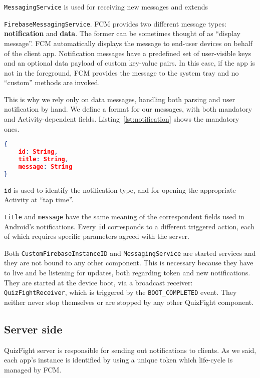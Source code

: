 \texttt{MessagingService} is used for receiving new messages and extends 

\texttt{FirebaseMessagingService}. FCM provides two different message types:
\textbf{notification} and \textbf{data}.
The former can be sometimes thought of as ``display message''.
FCM automatically displays the message to end-user devices on behalf of the
client app.
Notification messages have a predefined set of user-visible keys and an
optional data payload of custom key-value pairs.
In this case, if the app is not in the foreground, FCM provides the message to
the system tray and no ``custom'' methods are invoked.

This is why we rely only on data messages, handling both parsing and user
notification by hand.
We define a format for our messages, with both mandatory and Activity-dependent
fields. Listing~\ref{lst:notification} shows the mandatory ones.

\begin{lstlisting}[language=json, caption={Mandatory fields for a notification}, label={lst:notification}]
{
	id: String,
	title: String,
	message: String
}
\end{lstlisting}

\texttt{id} is used to identify the notification type, and for opening the
appropriate Activity at ``tap time''.

\texttt{title} and \texttt{message} have the same meaning of the correspondent
fields used in Android's notifications.
Every \texttt{id} corresponds to a different triggered action, each of which
requires specific parameters agreed with the server.

Both \texttt{CustomFirebaseInstanceID} and \texttt{MessagingService} are
started services and they are not bound to any other component.
This is necessary because they have to live and be listening for updates,
both regarding token and new notifications.
They are started at the device boot, via a broadcast receiver: 
\texttt{QuizFightReceiver}, which is triggered by the \texttt{BOOT\_COMPLETED}
event.
They neither never stop themselves or are stopped by any other QuizFight
component. 

\subsection{Server side}
QuizFight server is responsible for sending out notifications to clients.
As we said, each app's instance is identified by using a unique token which
life-cycle is managed by FCM.

